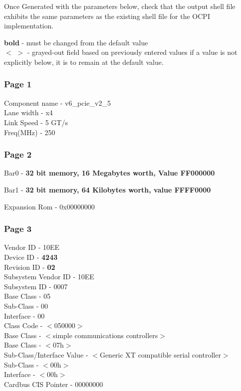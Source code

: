 Once Generated with the parameters below, check that the output shell file exhibits the same parameters as the existing shell file for the OCPI implementation.

\textbf{bold} - must be changed from the default value\\
$<$ $>$ - grayed-out field based on previously entered values
if a value is not explicitly below, it is to remain at the default value.


\subsubsection{Page 1}

Component name - v6\_pcie\_v2\_5\\
Lane width - x4\\
Link Speed - 5 GT/s\\
Freq(MHz) - 250\\

\subsubsection{Page 2}

Bar0 - \textbf{32 bit memory, 16 Megabytes worth, Value FF000000}

Bar1 - \textbf{32 bit memory, 64 Kilobytes worth, value FFFF0000}

Expansion Rom - 0x00000000

\subsubsection{Page 3}
Vendor ID - 10EE\\
Device ID - \textbf{4243}\\
Revision ID - \textbf{02}\\
Subsystem Vendor ID - 10EE\\
Subsystem ID - 0007\\
Base Class - 05\\
Sub-Class - 00\\
Interface - 00\\
Class Code - $<$050000$>$\\
Base Class - $<$simple communications controllers$>$\\
Base Class - $<$07h$>$\\
Sub-Class/Interface Value - $<$Generic XT compatible serial controller$>$\\
Sub-Class - $<$00h$>$\\
Interface - $<$00h$>$\\
Cardbus CIS Pointer - 00000000\\
